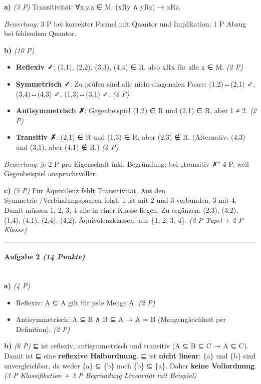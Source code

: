 \documentclass[11pt, a4paper]{article}
\begin{document}
\textbf{a)} \textit{(3 P)} Transitivität: ∀x,y,z ∈ M: (xRy ∧ yRz) → xRz.

\textit{Bewertung:} 3 P bei korrekter Formel mit Quantor und Implikation; 1 P Abzug bei fehlendem Quantor.


\textbf{b)} \textit{(10 P)}

\begin{itemize}
  \item \textbf{Reflexiv ✓}: (1,1), (2,2), (3,3), (4,4) ∈ R, also xRx für alle x ∈ M. \textit{(2 P)}
  \item \textbf{Symmetrisch ✓}: Zu prüfen sind alle nicht-diagonalen Paare: (1,2)↔(2,1) ✓, (3,4)↔(4,3) ✓, (1,3)↔(3,1) ✓. \textit{(2 P)}
  \item \textbf{Antisymmetrisch ✗}: Gegenbeispiel (1,2) ∈ R und (2,1) ∈ R, aber 1 ≠ 2. \textit{(2 P)}
  \item \textbf{Transitiv ✗}: (2,1) ∈ R und (1,3) ∈ R, aber (2,3) ∉ R. (Alternativ: (4,3) und (3,1), aber (4,1) ∉ R.) \textit{(4 P)}
\end{itemize}

\textit{Bewertung:} je 2 P pro Eigenschaft inkl. Begründung; bei „transitiv ✗" 4 P, weil Gegenbeispiel anspruchsvoller.


\textbf{c)} \textit{(5 P)} Für Äquivalenz fehlt Transitivität. Aus den Symmetrie-/Verbindungspaaren folgt: 1 ist mit 2 und 3 verbunden, 3 mit 4. Damit müssen 1, 2, 3, 4 alle in einer Klasse liegen. Zu ergänzen: (2,3), (3,2), (1,4), (4,1), (2,4), (4,2). Äquivalenzklassen: nur \{1, 2, 3, 4\}. \textit{(3 P Tupel + 2 P Klasse)}



\noindent\textcolor{rulegray}{\rule{\linewidth}{0.4pt}}


\paragraph{Aufgabe 2 \textit{(14 Punkte)}}\mbox{}\\[2pt]

\textbf{a)} \textit{(4 P)}

\begin{itemize}
  \item Reflexiv: A ⊆ A gilt für jede Menge A. \textit{(2 P)}
  \item Antisymmetrisch: A ⊆ B ∧ B ⊆ A → A = B (Mengengleichheit per Definition). \textit{(2 P)}
\end{itemize}

\textbf{b)} \textit{(6 P)} ⊑ ist reflexiv, antisymmetrisch und transitiv (A ⊆ B ⊆ C → A ⊆ C). Damit ist ⊑ eine \textbf{reflexive Halbordnung}. ⊑ ist \textbf{nicht linear}: \{a\} und \{b\} sind unvergleichbar, da weder \{a\} ⊆ \{b\} noch \{b\} ⊆ \{a\}. Daher \textbf{keine Vollordnung}. \textit{(3 P Klassifikation + 3 P Begründung Linearität mit Beispiel)}
\end{document}
